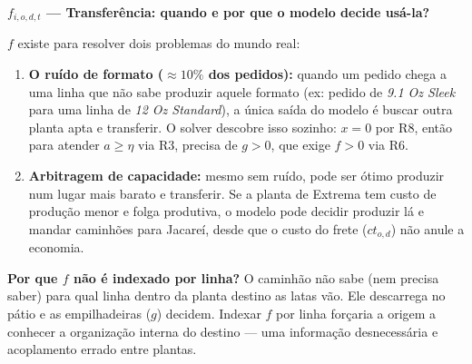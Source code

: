 \documentclass[12pt, a4paper]{article}
\begin{document}
\vspace{8pt}
\begin{mdframed}[style=destaque]
\textbf{\color{ballblue}$f_{i,o,d,t}$ --- Transfer\^{e}ncia: quando e por que o modelo decide usá-la?}

\medskip
$f$ existe para resolver dois problemas do mundo real:

\begin{enumerate}[leftmargin=1.5em, itemsep=4pt]
  \item \textbf{O ru\'{i}do de formato ($\approx 10\%$ dos pedidos):}
    quando um pedido chega a uma linha que n\~{a}o sabe produzir aquele formato
    (ex: pedido de \textit{9.1 Oz Sleek} para uma linha de \textit{12 Oz Standard}),
    a \'{u}nica sa\'{i}da do modelo \'{e} buscar outra planta apta e transferir.
    O solver descobre isso sozinho: $x = 0$ por R8, ent\~{a}o para atender $a \geq \eta$
    via R3, precisa de $g > 0$, que exige $f > 0$ via R6.

  \item \textbf{Arbitragem de capacidade:}
    mesmo sem ru\'{i}do, pode ser \'{o}timo produzir num lugar mais barato e transferir.
    Se a planta de Extrema tem custo de produ\c{c}\~{a}o menor e folga produtiva,
    o modelo pode decidir produzir l\'{a} e mandar caminh\~{o}es para Jacare\'{i},
    desde que o custo do frete ($ct_{o,d}$) n\~{a}o anule a economia.
\end{enumerate}

\medskip
\textbf{Por que $f$ n\~{a}o \'{e} indexado por linha?}
O caminh\~{a}o n\~{a}o sabe (nem precisa saber) para qual linha dentro da planta destino
as latas v\~{a}o. Ele descarrega no p\'{a}tio e as empilhadeiras ($g$) decidem.
Indexar $f$ por linha forçaria a origem a conhecer a organiza\c{c}\~{a}o interna do destino
--- uma informa\c{c}\~{a}o desnecessária e acoplamento errado entre plantas.
\end{mdframed}
\end{document}
